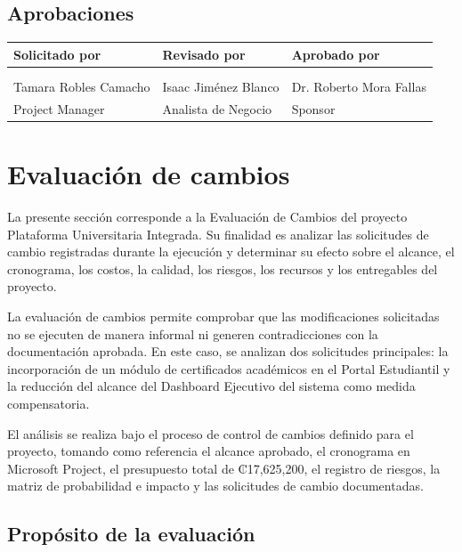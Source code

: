 \documentclass[11pt,spanish]{article}
\begin{document}
\subsection{Aprobaciones}

\begin{table}[H]
\centering
\begin{tabularx}{\textwidth}{Y Y Y}
\toprule
\textbf{Solicitado por} & \textbf{Revisado por} & \textbf{Aprobado por} \\
\midrule
& & \\
& & \\
Tamara Robles Camacho & Isaac Jiménez Blanco & Dr. Roberto Mora Fallas \\
Project Manager & Analista de Negocio & Sponsor \\
\bottomrule
\end{tabularx}
\end{table}

\newpage
\section{Evaluación de cambios}

La presente sección corresponde a la Evaluación de Cambios del proyecto Plataforma Universitaria Integrada. Su finalidad es analizar las solicitudes de cambio registradas durante la ejecución y determinar su efecto sobre el alcance, el cronograma, los costos, la calidad, los riesgos, los recursos y los entregables del proyecto.

La evaluación de cambios permite comprobar que las modificaciones solicitadas no se ejecuten de manera informal ni generen contradicciones con la documentación aprobada. En este caso, se analizan dos solicitudes principales: la incorporación de un módulo de certificados académicos en el Portal Estudiantil y la reducción del alcance del Dashboard Ejecutivo del sistema como medida compensatoria.

El análisis se realiza bajo el proceso de control de cambios definido para el proyecto, tomando como referencia el alcance aprobado, el cronograma en Microsoft Project, el presupuesto total de ₡17,625,200, el registro de riesgos, la matriz de probabilidad e impacto y las solicitudes de cambio documentadas.

\subsection{Propósito de la evaluación}
\end{document}
